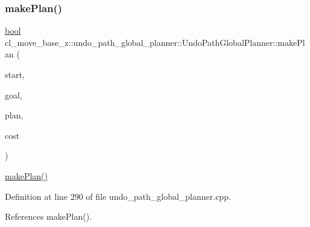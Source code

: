 \mbox{\label{classcl__move__base__z_1_1undo__path__global__planner_1_1UndoPathGlobalPlanner_aca09f640e4bda4d5ccc9613276fd3f71}} 
\subsubsection{\texorpdfstring{make\+Plan()}{makePlan()}\hspace{0.1cm}{\footnotesize\ttfamily [2/2]}}
{\footnotesize\ttfamily \hyperlink{classbool}{bool} cl\+\_\+move\+\_\+base\+\_\+z\+::undo\+\_\+path\+\_\+global\+\_\+planner\+::\+Undo\+Path\+Global\+Planner\+::make\+Plan (\begin{DoxyParamCaption}\item[{const geometry\+\_\+msgs\+::\+Pose\+Stamped \&}]{start,  }\item[{const geometry\+\_\+msgs\+::\+Pose\+Stamped \&}]{goal,  }\item[{std\+::vector$<$ geometry\+\_\+msgs\+::\+Pose\+Stamped $>$ \&}]{plan,  }\item[{double \&}]{cost }\end{DoxyParamCaption})}

\hyperlink{classcl__move__base__z_1_1undo__path__global__planner_1_1UndoPathGlobalPlanner_a46034d27c0811abae440009457a7f8b0}{make\+Plan()} 

Definition at line 290 of file undo\+\_\+path\+\_\+global\+\_\+planner.\+cpp.



References make\+Plan().


